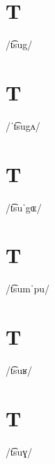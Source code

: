 \documentclass[10pt,a4paper,twoside]{book}
\begin{document}
\section*{T}

\begin{multicols}{3}
 {/t͡sug/} {}
\end{multicols}

\section*{T}

\begin{multicols}{3}
 {/ˈt͡sugʌ/} {}
\end{multicols}

\section*{T}

\begin{multicols}{3}
 {/t͡suˈgɶ/} {}
\end{multicols}

\section*{T}

\begin{multicols}{3}
 {/t͡sumˈpu/} {}
\end{multicols}

\section*{T}

\begin{multicols}{3}
 {/t͡suʁ/} {}
\end{multicols}

\section*{T}

\begin{multicols}{3}
 {/t͡suɣ/} {}
\end{multicols}
\end{document}
